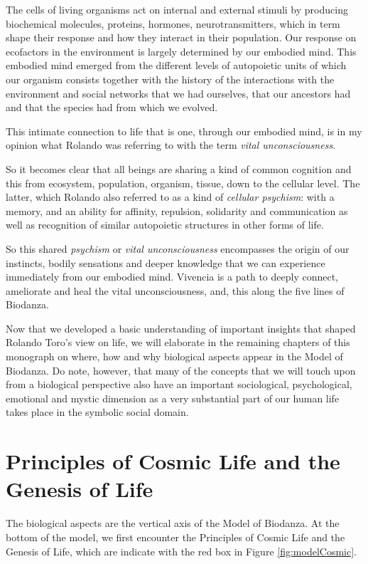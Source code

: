 \documentclass[
  11pt,
]{book}
\begin{document}
The cells of living organisms act on internal and external stimuli by producing biochemical molecules, proteins, hormones, neurotransmitters, which in term shape their response and how they interact in their population.
Our response on ecofactors in the environment is largely determined by our embodied mind. This embodied mind emerged from the different levels of autopoietic units of which our organism consists together with the history of the interactions with the environment and social networks that we had ourselves, that our ancestors had and that the species had from which we evolved.

This intimate connection to life that is one, through our embodied mind, is in my opinion what Rolando was referring to with the term \emph{vital unconsciousness}.

So it becomes clear that all beings are sharing a kind of common cognition and this from ecosystem, population, organism, tissue, down to the cellular level. The latter, which Rolando also referred to as a kind of \emph{cellular psychism}: with a memory, and an ability for affinity, repulsion, solidarity and communication as well as recognition of similar autopoietic structures in other forms of life.

So this shared \emph{psychism} or \emph{vital unconsciousness} encompasses the origin of our instincts, bodily sensations and deeper knowledge that we can experience immediately from our embodied mind. Vivencia is a path to deeply connect, ameliorate and heal the vital unconsciousness, and, this along the five lines of Biodanza.

Now that we developed a basic understanding of important insights that shaped Rolando Toro's view on life, we will elaborate in the remaining chapters of this monograph on where, how and why biological aspects appear in the Model of Biodanza. Do note, however, that many of the concepts that we will touch upon from a biological perspective also have an important sociological, psychological, emotional and mystic dimension as a very substantial part of our human life takes place in the symbolic social domain.

\hypertarget{principles-of-cosmic-life-and-the-genesis-of-life}{%
\chapter{Principles of Cosmic Life and the Genesis of Life}\label{principles-of-cosmic-life-and-the-genesis-of-life}}

The biological aspects are the vertical axis of the Model of Biodanza.
At the bottom of the model, we first encounter the Principles of Cosmic Life and the Genesis of Life, which are indicate with the red box in Figure \ref{fig:modelCosmic}.
\end{document}
